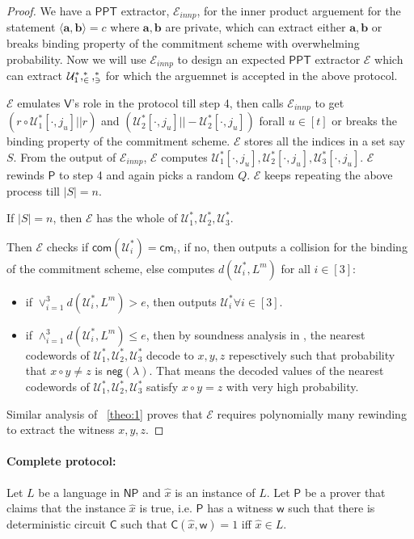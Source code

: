 \documentclass[runningheads]{llncs}
\newcommand{\innp}[2]{\langle #1,#2\rangle}
\def\ppt{\mathsf{PPT}}
\def\extrac{\mathcal{E}}
\def\prover{\mathsf{P}}
\def\verifier{\mathsf{V}}
\def\cm{\mathsf{cm}} %
\def\com{\mathsf{com}} %
\def\negl{\mathsf{neg}}
\def\NP{\mathsf{NP}}
\def\C{\mathsf{C}} %
\def\wit{\mathsf{w}} %
\def\stmt{\hat{x}} %
\def\calU{\mathcal{U}}
\begin{document}
	\begin{proof}
	We have a $\ppt$ extractor, $\extrac_{innp}$, for the inner product arguement for the statement $\innp{\bm{a}}{\bm{b}}=c$ where $\bm{a},\bm{b}$ are private, which can extract either $\bm{a}, \bm{b}$ or breaks binding property of the commitment scheme with overwhelming probability. Now we will use $\extrac_{innp}$ to design an expected $\ppt$ extractor $\extrac$ which can extract $\calU^*_1, \cal^*_2, \cal^*_3$ for which the arguemnet is accepted in the above protocol.
	
	$\extrac$ emulates $\verifier$'s role in the protocol till step 4, then calls $\extrac_{innp}$ to get $(r\circ \calU^*_1[\cdot,j_u]||r)$ and $(\calU^*_2[\cdot,j_u]||-\calU^*_2[\cdot,j_u])$ forall $u\in [t]$ or breaks the binding property of the commitment scheme. $\extrac$ stores all the indices in a set say $S$. From the output of $\extrac_{innp}$, $\extrac$ computes $\calU^*_1[\cdot,j_u], \calU^*_2[\cdot,j_u],\calU^*_3[\cdot,j_u]$. $\extrac$ rewinds $\prover$ to step 4 and again picks a random $Q$. $\extrac$ keeps repeating the above process till $|S|=n$.
	 
	If $|S|=n$, then $\extrac$ has the whole of $\calU^*_1, \calU^*_2, \calU^*_3$.
	
	Then $\extrac$ checks if $\com(\calU^*_i)=\cm_i$, if no, then outputs a collision for the binding of the commitment scheme, else computes $d(\calU^*_i, L^m)$ for all $i \in [3]$:
	
	\begin{itemize}
		\item if $\vee_{i=1}^{3} d(\calU^*_i, L^m) > e$, then outputs $\calU^*_i \forall i\in [3]$.
		
		\item if $\wedge_{i=1}^3 d(\calU^*_i, L^m) \leq e$, then by soundness analysis in \cite{Ligero2017}, the nearest codewords of $\calU^*_1, \calU^*_2, \calU^*_3$ decode to $x, y, z$ repesctively such that probability that $x \circ y \neq z$ is $\negl(\lambda)$. That means the decoded values of the nearest codewords of $\calU^*_1, \calU^*_2, \calU^*_3$ satisfy $x\circ y = z$ with very high probability.
	\end{itemize}
	 
	Similar analysis of ~\ref{theo:1} proves that $\extrac$ requires polynomially many rewinding to extract the witness $x, y, z$.
	\end{proof}
	
		
	\paragraph{\textbf{Complete protocol:}} Let $L$ be a language in $\NP$ and $\stmt$ is an instance of $L$. Let $\prover$ be a prover that claims that the instance $\stmt$ is true, i.e. $\prover$ has a witness $\wit$ such that there is deterministic circuit $\C$ such that $\C(\stmt,\wit)=1$ iff $\stmt \in L$. 
	
\end{document}
